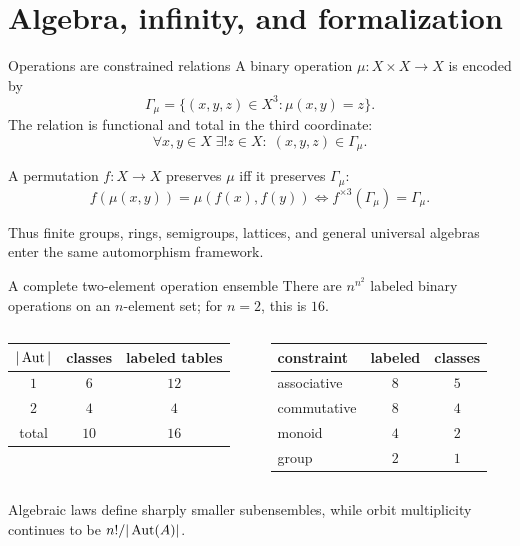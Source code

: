 \section{Algebra, infinity, and formalization}

\begin{frame}{Operations are constrained relations}
  A binary operation $\mu:X\times X\to X$ is encoded by
  \[
    \Gamma_\mu=\{(x,y,z)\in X^3:\mu(x,y)=z\}.
  \]
  The relation is functional and total in the third coordinate:
  \[
    \forall x,y\in X\;\exists!z\in X:\;(x,y,z)\in\Gamma_\mu.
  \]

  \begin{theorem}
    A permutation $f:X\to X$ preserves $\mu$ iff it preserves $\Gamma_\mu$:
    \[
      f(\mu(x,y))=\mu(f(x),f(y))
      \iff
      f^{\times3}(\Gamma_\mu)=\Gamma_\mu.
    \]
  \end{theorem}

  Thus finite groups, rings, semigroups, lattices, and general universal
  algebras enter the same automorphism framework.
\end{frame}

\begin{frame}{A complete two-element operation ensemble}
  There are $n^{n^2}$ labeled binary operations on an $n$-element set; for
  $n=2$, this is $16$.

  \begin{columns}[T]
      \centering
      \begin{tabular}{ccc}
        \toprule
        $|\operatorname{Aut}|$ & classes & labeled tables \\
        \midrule
        $1$ & $6$ & $12$ \\
        $2$ & $4$ & $4$ \\
        \midrule
        total & $10$ & $16$ \\
        \bottomrule
      \end{tabular}
      \centering
      \begin{tabular}{lcc}
        \toprule
        constraint & labeled & classes \\
        \midrule
        associative & $8$ & $5$ \\
        commutative & $8$ & $4$ \\
        monoid & $4$ & $2$ \\
        group & $2$ & $1$ \\
        \bottomrule
      \end{tabular}
  \end{columns}

  \vspace{0.7em}
  Algebraic laws define sharply smaller subensembles, while orbit multiplicity
  continues to be $n!/|\operatorname{Aut}(A)|$.
\end{frame}

